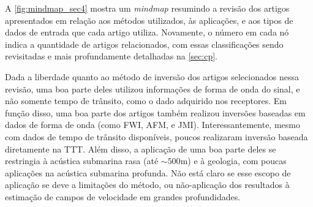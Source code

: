 A \cref{fig:mindmap_sec4} mostra um \textsl{mindmap} resumindo a revisão dos artigos apresentados em relação aos métodos utilizados, às aplicações, e aos tipos de dados de entrada que cada artigo utiliza. Novamente, o número em cada nó indica a quantidade de artigos relacionados, com essas classificações sendo revisitadas e mais profundamente detalhadas na \cref{sec:cp}.

Dada a liberdade quanto ao método de inversão dos artigos selecionados nessa revisão, uma boa parte deles utilizou informações de forma de onda do sinal, e não somente tempo de trânsito, como o dado adquirido nos receptores. Em função disso, uma boa parte dos artigos também realizou inversões baseadas em dados de forma de onda (como FWI, AFM, e JMI). Interessantemente, mesmo com dados de tempo de trânsito disponíveis, poucos realizaram inversão baseada diretamente na TTT. Além disso, a aplicação de uma boa parte deles se restringia à acústica submarina rasa (até $\sim500\si{\meter}$) e à geologia, com poucas aplicações na acústica submarina profunda. Não está claro se esse escopo de aplicação se deve a limitações do método, ou não-aplicação dos resultados à estimação de campos de velocidade em grandes profundidades.